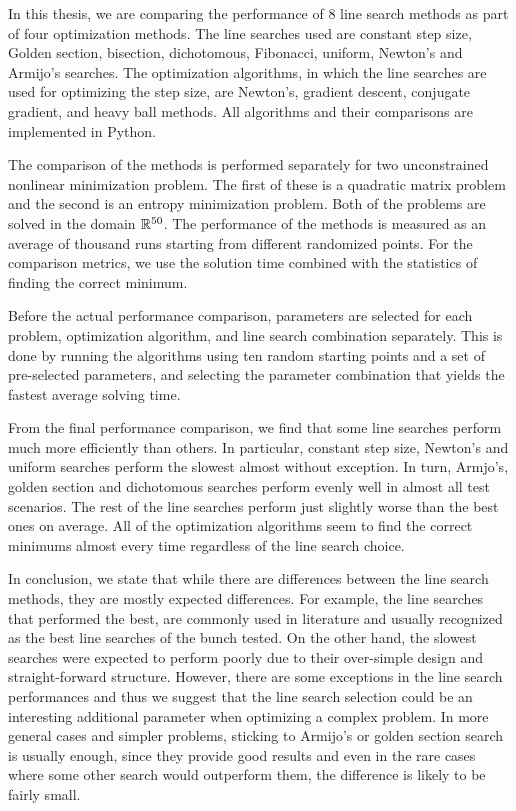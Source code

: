 \documentclass[english, 12pt, a4paper, sci, utf8, a-1b, online, table]{aaltothesis}
\newcommand{\R}{\ensuremath\mathbb{R}}
\begin{document}
\begin{abstractpage}[english]
  In this thesis, we are comparing the performance of 8 line search methods as part of four optimization methods. The line searches used are constant step size, Golden section, bisection, dichotomous, Fibonacci, uniform, Newton's and Armijo's searches. The optimization algorithms, in which the line searches are used for optimizing the step size, are Newton's, gradient descent, conjugate gradient, and heavy ball methods. All algorithms and their comparisons are implemented in Python.
  
  The comparison of the methods is performed separately for two unconstrained nonlinear minimization problem. The first of these is a quadratic matrix problem and the second is an entropy minimization problem. Both of the problems are solved in the domain $\R^{50}$. The performance of the methods is measured as an average of thousand runs starting from different randomized points. For the comparison metrics, we use the solution time combined with the statistics of finding the correct minimum.
  
  Before the actual performance comparison, parameters are selected for each problem, optimization algorithm, and line search combination separately. This is done by running the algorithms using ten random starting points and a set of pre-selected parameters, and selecting the parameter combination that yields the fastest average solving time.
  
  From the final performance comparison, we find that some line searches perform much more efficiently than others. In particular, constant step size, Newton's and uniform searches perform the slowest almost without exception. In turn, Armjo's, golden section and dichotomous searches perform evenly well in almost all test scenarios. The rest of the line searches perform just slightly worse than the best ones on average. All of the optimization algorithms seem to find the correct minimums almost every time regardless of the line search choice.
  
  In conclusion, we state that while there are differences between the line search methods, they are mostly expected differences. For example, the line searches that performed the best, are commonly used in literature and usually recognized as the best line searches of the bunch tested. On the other hand, the slowest searches were expected to perform poorly due to their over-simple design and straight-forward structure. However, there are some exceptions in the line search performances and thus we suggest that the line search selection could be an interesting additional parameter when optimizing a complex problem. In more general cases and simpler problems, sticking to Armijo's or golden section search is usually enough, since they provide good results and even in the rare cases where some other search would outperform them, the difference is likely to be fairly small.
\end{abstractpage}
\end{document}
